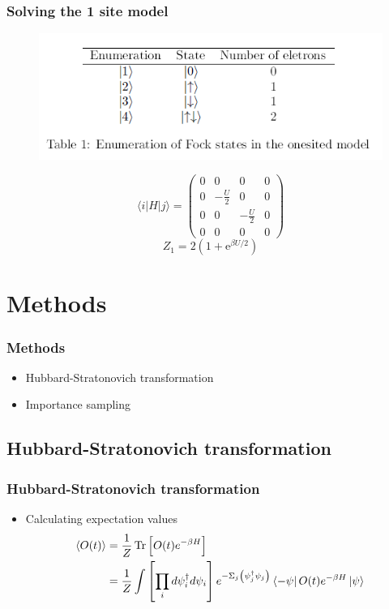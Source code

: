 \documentclass{beamer}
\begin{document}
\begin{frame}
\frametitle{Solving the 1 site model}

\begin{figure}[h]
	\centering
	\includegraphics[width=0.7\linewidth]{states}
	\label{fig:states1}
\end{figure}
\begin{equation*}
\langle i|H|j\rangle=
\begin{pmatrix}
0 & 0 & 0&0\\
0 & -\frac{U}{2} & 0&0\\
0 & 0 & -\frac{U}{2}&0\\
0 & 0 & 0&0
\end{pmatrix}
\end{equation*}
\begin{equation}
Z_{1}= 2 (1+\text{e}^{\beta U/2})
\label{partition1}
\end{equation}
\end{frame}


\section{Methods}
\begin{frame}
	\frametitle{Methods}
	\begin{itemize}
		\item Hubbard-Stratonovich transformation
		\item Importance sampling
	\end{itemize}
\end{frame}

\subsection{Hubbard-Stratonovich transformation}
\begin{frame}
\frametitle{Hubbard-Stratonovich transformation}
\begin{itemize}

\item Calculating expectation values
\begin{align*}\label{Pathintegral}
\langle O(t)\rangle &= \frac{1}{Z} \operatorname{Tr}\left[O(t) e^{-\beta H}\right]\\ &=
\frac{1}{Z} \int\left[\prod_{i} d \psi_{i}^{\dagger} d \psi_{i}\right] e^{-\Sigma_{j}\left(\psi_{j}^{\dagger} \psi_{j}\right)}\bra{-\psi}O(t) e^{-\beta H}\ket{\psi}
\end{align*}
\end{itemize}
\end{frame}
\end{document}
